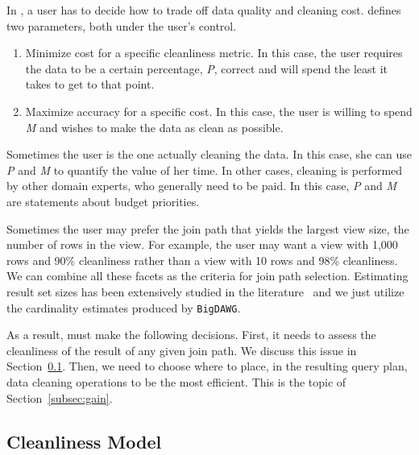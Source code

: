 In \dcv, a user has to decide how to trade off data quality and cleaning cost. 
\dcv defines two parameters, both under the user's control.

\begin{enumerate}
\item Minimize cost for a specific cleanliness metric. In this case, the user requires the data to be a certain percentage, \emph{P}, correct and will spend the least it takes to get to that point.

\item Maximize accuracy for a specific cost. In this case, the user is willing to spend \emph{M} and wishes to make the data as clean as possible.
\end{enumerate}

Sometimes the user is the one actually cleaning the data. In this case, she can use \emph{P} and \emph{M} to quantify the value of her time. 
In other cases, cleaning is performed by other domain experts, who generally need to be paid. In this case, \emph{P} and \emph{M} are statements about budget priorities.

Sometimes the user may prefer the join path that yields the largest view size, \ie the number of rows in the view. 
For example, the user may want a view with 1,000 rows and 90\% cleanliness rather than a view with 10 rows and 98\% cleanliness. 
We can combine all these facets as the criteria for join path selection.
Estimating result set sizes has been extensively studied in the literature~\cite{DBLP:conf/sigmod/IoannidisP95} and we just utilize the cardinality estimates produced by \texttt{BigDAWG}.

As a result, \dcv must make the following decisions. 
First, it needs to assess the cleanliness of the result of any given join path. We discuss this issue in Section~\ref{subsec:model}. 
Then, we need to choose where to place, in the resulting query plan, data cleaning operations to be the most efficient. This is the topic of Section~\ref{subsec:gain}.


\subsection{Cleanliness Model}
\label{subsec:model}


